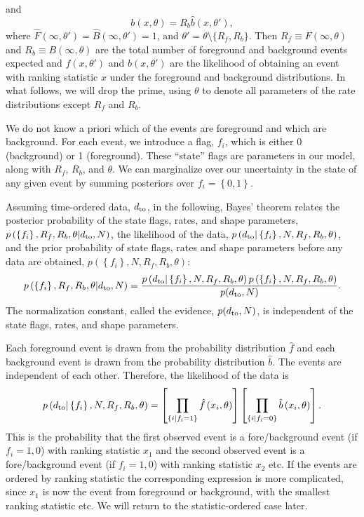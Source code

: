 \documentclass[aps,prd]{revtex4-1}
\newcommand{\mathset}[1]{\left\{ #1 \right\}}
\begin{document}
and 
\begin{equation}
  b(x, \theta) = R_b \hat{b}(x, \theta'),
\end{equation}
where $\hat{F}(\infty, \theta') = \hat{B}(\infty, \theta') = 1$, and
$\theta' = \theta \setminus \{R_{f}, R_{b} \}$.  Then $R_f \equiv
  F(\infty,\theta)$ and $R_b \equiv B(\infty,\theta)$ are the
total number of foreground and background events expected and
$\hat{f}(x, \theta')$ and $\hat{b}(x, \theta')$ are the likelihood of
obtaining an event with ranking statistic $x$ under the foreground and
background distributions.  In what follows, we will drop the prime,
using $\theta$ to denote all parameters of the rate distributions
except $R_f$ and $R_b$.

We do not know a priori which of the events are foreground and which
are background.  For each event, we introduce a flag, $f_i$, which is
either 0 (background) or 1 (foreground).  These
``state'' flags are parameters in our model, along with $R_f$, $R_b$,
and $\theta$.  We can marginalize over our uncertainty in the state of
any given event by summing posteriors over $f_i = \mathset{0,1}$.

Assuming time-ordered data, $d_{\rm to}$, in the following, Bayes' theorem relates the posterior probability of the state flags,
rates, and shape parameters, $p\left(\mathset{f_i}, R_f, R_b, \theta |
  d_{\rm to}, N \right)$, the likelihood of the data, $p\left( d_{\rm to} | \mathset{f_i}, N, 
  R_f, R_b, \theta\right)$, and the prior probability of state flags,
rates and shape parameters before any data are obtained, $p\left(
  \mathset{f_i}, N, R_f, R_b, \theta\right)$:
\begin{equation}
  \label{eq:Bayes}
  p\left(\mathset{f_i}, R_f, R_b, \theta | d_{\rm to}, N \right)  =
  \frac{p\left( d_{\rm to} | \mathset{f_i}, N, R_f, R_b, \theta\right)
  p\left(\mathset{f_i}, N, R_f, R_b, \theta\right)}{p(d_{\rm to}, N)}. 
\end{equation}
The normalization constant, called the evidence, $p(d_{\rm to}, N)$, is
independent of the state flags, rates, and shape parameters.

Each foreground event is drawn from the probability distribution
$\hat{f}$ and each background event is drawn from the probability
distribution $\hat{b}$.  The events are independent of each other.
Therefore, the likelihood of the data is 
\begin{equation}
  p\left( d_{\rm to} | \mathset{f_i}, N, R_f, R_b, \theta\right)  = \left[
    \prod_{\mathset{i | f_i = 1}} \hat{f}\left(x_i, \theta\right) \right]
  \left[ \prod_{\mathset{i | f_i = 0}} \hat{b}\left( x_i, \theta\right)
  \right].  
\end{equation}
This is the probability that the first observed event is a fore/background event (if $f_i=1,0$) with ranking statistic $x_1$ and the second observed event is a fore/background event (if $f_i=1,0$) with ranking statistic $x_2$ etc. If the events are ordered by ranking statistic the corresponding expression is more complicated, since $x_1$ is now the event  from foreground or background, with the smallest ranking statistic etc. We will return to the statistic-ordered case later. 
\end{document}
